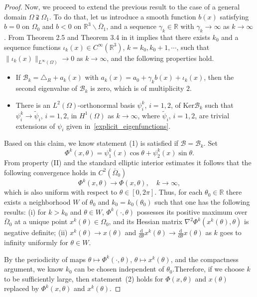\documentclass{elsarticle}
\begin{document}
\begin{proof}
Now, we proceed to extend the previous result to the case of a general domain $\Omega\supsetneqq\Omega_1$. To do that, let us introduce a smooth function $b(x)$ satisfying $b=0$ on $\Omega_0$ and $b<0$ on $\mathbb{R}^3\backslash\bar{\Omega}_1$, and a sequence $\gamma_k\in\mathbb{R}$ with $\gamma_k\rightarrow\infty$ as $k\rightarrow\infty$. From Theorem 2.5 and Theorem 3.4 in \cite{prizzi1998inverse} it implies that there exists $k_0$ and a sequence functions $\iota_k(x)\in C^\infty(\mathbb{R}^3)$, $k = k_0, k_0 +1, \cdots$, such that $\|\iota_k(x)\|_{L^\infty(\Omega)}\rightarrow 0$ as $k\rightarrow\infty$, and the following properties hold.
\begin{itemize}
\item[(I)] If $\mathcal{B}_k = \triangle_{R} + a_k(x)$ with $a_k(x) = a_0 + \gamma_k b(x) + \iota_k(x)$, then the second eigenvalue of $\mathcal{B}_k$ is zero, which is of multiplicity $2$.
\item[(II)] There is an $L^2(\Omega)$-orthonormal basis $\psi^{k}_i$, $i=1, 2$, of $\mathrm{Ker}\mathcal{B}_k$ such that $\psi^{k}_i\rightarrow\tilde{\psi}_i$, $i=1, 2$, in $H^1(\Omega)$ as $k\rightarrow\infty$, where $\tilde{\psi}_i$, $i=1, 2$, are trivial extensions of $\psi_i$ given in~\eqref{explicit_eigenfunctions}. 
\end{itemize}
Based on this claim, we know statement (1) is satisfied if $\mathcal{B}=\mathcal{B}_k$. Set 
\[
\Phi^k(x, \theta) = \psi^k_1(x)\cos\theta + \psi^k_2(x)\sin\theta.
\]
From property (II) and the standard elliptic interior estimates it follows that the following convergence holds in $C^2(\bar{\Omega}_0)$ 
\[
	\Phi^k(x, \theta)\rightarrow \Phi(x, \theta), \quad k\rightarrow\infty,
\]
which is also uniform with respect to $\theta\in[0, 2\pi]$. Thus, for each $\theta_0\in\mathbb{R}$ there exists a neighborhood $W$ of $\theta_0$ and $k_0 = k_0(\theta_0)$ such that one has the following results: (i) for $k>k_0$ and $\theta\in W$, $\Phi^k(\cdot, \theta)$ possesses its positive maximum over $\bar{\Omega}_0$ at a unique point $x^{k}(\theta)\in\Omega_0$, and its Hessian matrix $\nabla^2\Phi^k(x^k(\theta), \theta)$ is negative definite; (ii) $x^k(\theta)\rightarrow x(\theta)$ and $\frac{\mathrm{d}}{\mathrm{d}\theta}x^k(\theta)\rightarrow \frac{\mathrm{d}}{\mathrm{d}\theta}x(\theta)$ as $k$ goes to infinity uniformly for $\theta\in W$. 

By the periodicity of maps $\theta\mapsto\Phi^k(\cdot, \theta)$, $\theta\mapsto x^k(\theta)$, and the compactness argument, we know $k_0$ can be chosen independent of $\theta_0$.Therefore, if we choose $k$ to be sufficiently large, then statement~(2) holds for $\Phi(x, \theta)$ and $x(\theta)$ replaced by $\Phi^k(x, \theta)$ and $x^k(\theta)$.
\end{proof}
\end{document}
